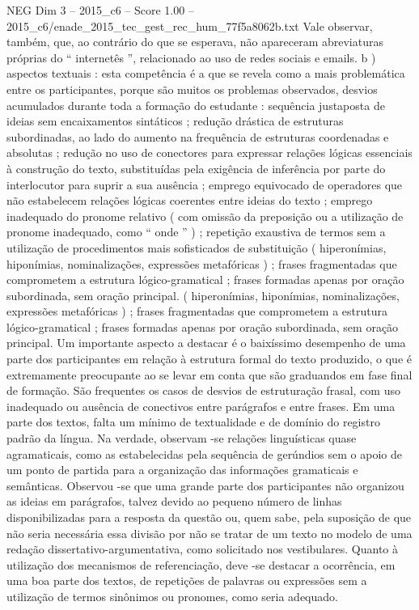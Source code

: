 \begin{textsample}{NEG Dim 3 – 2015\_c6 – Score 1.00 – 2015\_c6/enade\_2015\_tec\_gest\_rec\_hum\_77f5a8062b.txt}
Vale observar, também, que, ao contrário do que se esperava, não apareceram abreviaturas próprias do “ internetês ”, relacionado ao uso de redes sociais e emails. b ) aspectos textuais : esta competência é a que se revela como a mais problemática entre os participantes, porque são muitos os problemas observados, desvios acumulados durante toda a formação do estudante : sequência justaposta de ideias sem encaixamentos sintáticos ; redução drástica de estruturas subordinadas, ao lado do aumento na frequência de estruturas coordenadas e absolutas ; redução no uso de conectores para expressar relações lógicas essenciais à construção do texto, substituídas pela exigência de inferência por parte do interlocutor para suprir a sua ausência ; emprego equivocado de operadores que não estabelecem relações lógicas coerentes entre ideias do texto ; emprego inadequado do pronome relativo ( com omissão da preposição ou a utilização de pronome inadequado, como “ onde ” ) ; repetição exaustiva de termos sem a utilização de procedimentos mais sofisticados de substituição ( hiperonímias, hiponímias, nominalizações, expressões metafóricas ) ; frases fragmentadas que comprometem a estrutura lógico-gramatical ; frases formadas apenas por oração subordinada, sem oração principal. ( hiperonímias, hiponímias, nominalizações, expressões metafóricas ) ; frases fragmentadas que comprometem a estrutura lógico-gramatical ; frases formadas apenas por oração subordinada, sem oração principal.
Um importante aspecto a destacar é o baixíssimo desempenho de uma parte dos participantes em relação à estrutura formal do texto produzido, o que é extremamente preocupante ao se levar em conta que são graduandos em fase final de formação.
São frequentes os casos de desvios de estruturação frasal, com uso inadequado ou ausência de conectivos entre parágrafos e entre frases.
Em uma parte dos textos, falta um mínimo de textualidade e de domínio do registro padrão da língua.
Na verdade, observam -se relações linguísticas quase agramaticais, como as estabelecidas pela sequência de gerúndios sem o apoio de um ponto de partida para a organização das informações gramaticais e semânticas.
Observou -se que uma grande parte dos participantes não organizou as ideias em parágrafos, talvez devido ao pequeno número de linhas disponibilizadas para a resposta da questão ou, quem sabe, pela suposição de que não seria necessária essa divisão por não se tratar de um texto no modelo de uma redação dissertativo-argumentativa, como solicitado nos vestibulares.
Quanto à utilização dos mecanismos de referenciação, deve -se destacar a ocorrência, em uma boa parte dos textos, de repetições de palavras ou expressões sem a utilização de termos sinônimos ou pronomes, como seria adequado.

\end{textsample}
